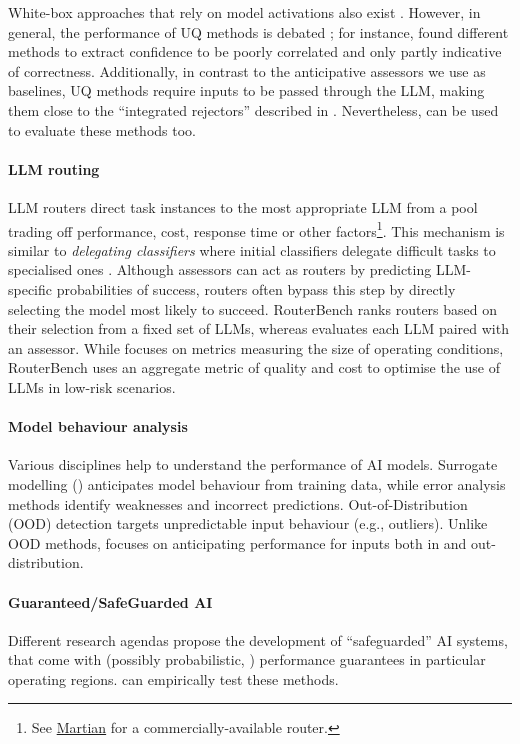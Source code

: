 White-box approaches that rely on model activations also exist \citep{ferrando2025do}.
However, in general, the performance of UQ methods is debated \citep{kapoor}; for instance, \citet{pawitan2024confidence} found  different methods to extract confidence to be poorly correlated and only partly indicative of correctness.
Additionally, in contrast to the anticipative assessors we use as baselines, %
UQ methods require inputs to be passed through the LLM, making them close to the ``integrated rejectors'' described in \cite{hendrickx2024machine}. Nevertheless, \predbench can be used to evaluate these methods too.



\paragraph{LLM routing}
LLM routers \citep{lee2023orchestrallm,vsakota2024fly,lu2023routing,shnitzer2023LargeLanguageModel,ding2024hybrid}
direct task instances to the most appropriate LLM from a pool 
trading off performance, cost, response time or other factors\footnote{See \href{https://withmartian.com/}{Martian} for a commercially-available router.}.
This mechanism %
is similar to %
\textit{delegating classifiers}  where initial classifiers delegate difficult tasks to %
specialised ones 
\citep{ferri2004delegating}. Although assessors can act %
as routers by predicting LLM-specific probabilities of success, routers often bypass this step by directly selecting the model most likely to succeed. %
RouterBench \citep{hu2024routerbench} ranks routers based on their selection from a fixed set of LLMs, whereas \predbench evaluates each LLM paired with an  assessor.  %
While \predbench focuses on metrics %
measuring the size of operating conditions,  %
RouterBench uses an aggregate metric of %
quality and cost to optimise the use of %
LLMs in low-risk scenarios.


\paragraph{Model behaviour analysis} Various disciplines  %
help %
to understand the performance of %
AI models. %
 Surrogate modelling %
(\citealp{ilyas2022datamodels}) %
anticipates model behaviour from training data, while %
error analysis methods \cite{amershi2015modeltracker} %
identify %
weaknesses and %
incorrect predictions. Out-of-Distribution (OOD) detection \cite{hendrycks2016baseline,liang2017enhancing} targets %
unpredictable input behaviour (e.g., outliers). Unlike OOD methods, %
\predbench focuses on %
anticipating performance for inputs both in and out-distribution.





\paragraph{Guaranteed/SafeGuarded AI} Different research agendas \citep{dalrymple2024guaranteedsafeaiframework, darpa2024} propose the development of ``safeguarded'' AI systems, that come with (possibly probabilistic, \citealp{bengio2024bayesianoraclepreventharm}) performance guarantees in particular operating regions. \predbench can empirically test these methods.